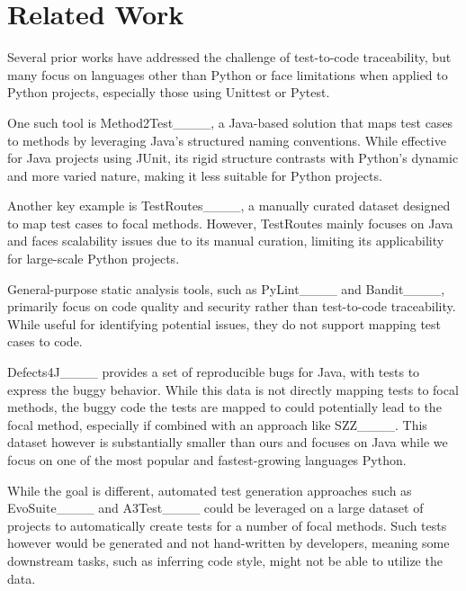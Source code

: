 \section{Related Work}
Several prior works have addressed the challenge of test-to-code traceability, but many focus on languages other than Python or face limitations when applied to Python projects, especially those using Unittest or Pytest.

One such tool is Method2Test____, a Java-based solution that maps test cases to methods by leveraging Java’s structured naming conventions. While effective for Java projects using JUnit, its rigid structure contrasts with Python’s dynamic and more varied nature, making it less suitable for Python projects.

Another key example is TestRoutes____, a manually curated dataset designed to map test cases to focal methods. However, TestRoutes mainly focuses on Java and faces scalability issues due to its manual curation, limiting its applicability for large-scale Python projects.

General-purpose static analysis tools, such as PyLint____ and Bandit____, primarily focus on code quality and security rather than test-to-code traceability. While useful for identifying potential issues, they do not support mapping test cases to code.

Defects4J____ provides a set of reproducible bugs for Java, with tests to express the buggy behavior.  While this data is not directly mapping tests to focal methods, the buggy code the tests are mapped to could potentially lead to the focal method, especially if combined with an approach like SZZ____.  This dataset however is substantially smaller than ours and focuses on Java while we focus on one of the most popular and fastest-growing languages Python.

While the goal is different, automated test generation approaches such as EvoSuite____ and A3Test____ could be leveraged on a large dataset of projects to automatically create tests for a number of focal methods.  Such tests however would be generated and not hand-written by developers, meaning some downstream tasks, such as inferring code style, might not be able to utilize the data.